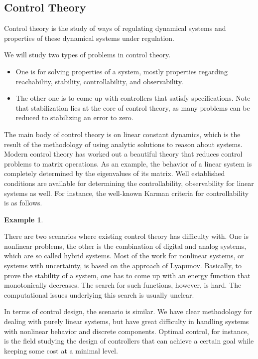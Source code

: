 \documentclass[10pt]{article}
\theoremstyle{definition}
\newtheorem{example}{Example}[section]
\begin{document}
\subsection{Control Theory} 

Control theory is the study of ways of regulating dynamical systems and properties of these dynamical systems under regulation. 

We will study two types of problems in control theory. 
\begin{itemize}
\item One is for solving properties of a system, mostly properties regarding reachability, stability, controllability, and observability. 
\item The other one is to come up with controllers that satisfy specifications. Note that stabilization lies at the core of control theory, as many problems can be reduced to stabilizing an error to zero. 
\end{itemize}
The main body of control theory is on linear constant dynamics, which is the result of the methodology of using analytic solutions to reason about systems. Modern control theory has worked out a beautiful theory that reduces control problems to matrix operations. As an example, the behavior of a linear system is completely determined by the eigenvalues of its matrix. Well established conditions are available for determining the controllability, observability for linear systems as well. For instance, the well-known Karman criteria for controllability is as follows. 
\begin{example}

\end{example}

There are two scenarios where existing control theory has difficulty with. One is nonlinear problems, the other is the combination of digital and analog systems, which are so called hybrid systems. Most of the work for nonlinear systems, or systems with uncertainty, is based on the approach of Lyapunov. Basically, to prove the stability of a system, one has to come up with an energy function that monotonically decreases. The search for such functions, however, is hard. The computational issues underlying this search is usually unclear.~\cite{}

In terms of control design, the scenario is similar. We have clear methodology for dealing with purely linear systems, but have great difficulty in handling systems with nonlinear behavior and discrete components. Optimal control, for instance, is the field studying the design of controllers that can achieve a certain goal while keeping some cost at a minimal level. 
\end{document}
